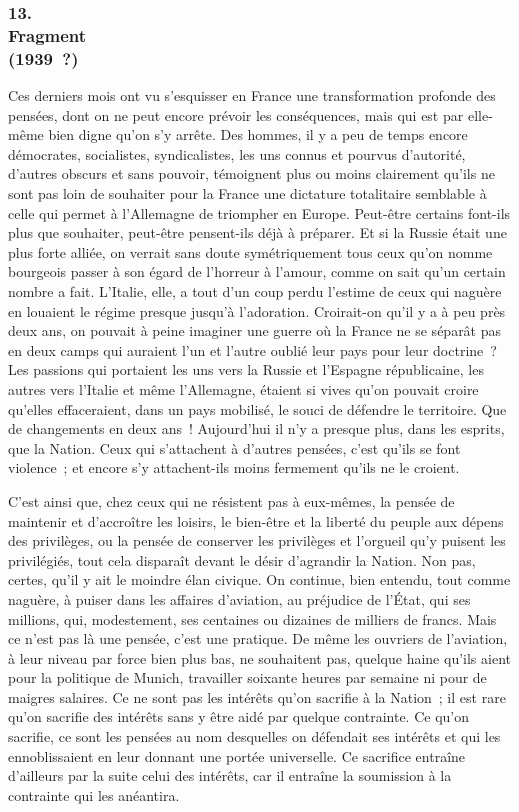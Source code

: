 \documentclass[french,twoside]{book} %
\begin{document}
\subsubsection[{13. Fragment, (1939 ?)}]{13. \\
Fragment \\
(1939 ?)}
\noindent \par
Ces derniers mois ont vu s'esquisser en France une transformation profonde des pensées, dont on ne peut encore prévoir les conséquences, mais qui est par elle-même bien digne qu'on s'y arrête. Des hommes, il y a peu de temps encore démocrates, socialistes, syndicalistes, les uns connus et pourvus d'autorité, d'autres obscurs et sans pouvoir, témoignent plus ou moins clairement qu'ils ne sont pas loin de souhaiter pour la France une dictature totalitaire semblable à celle qui permet à l'Allemagne de triompher en Europe. Peut-être certains font-ils plus que souhaiter, peut-être pensent-ils déjà à préparer. Et si la Russie était une plus forte alliée, on verrait sans doute symétriquement tous ceux qu'on nomme bourgeois passer à son égard de l'horreur à l'amour, comme on sait qu'un certain nombre a fait. L'Italie, elle, a tout d'un coup perdu l'estime de ceux qui naguère en louaient le régime presque jusqu'à l'adoration. Croirait-on qu'il y a à peu près deux ans, on pouvait à peine imaginer une guerre où la France ne se séparât pas en deux camps qui auraient l'un et l'autre oublié leur pays pour leur doctrine ? Les passions qui portaient les uns vers la Russie et l'Espagne républicaine, les autres vers l'Italie et même l'Allemagne, étaient si vives qu'on pouvait croire qu'elles effaceraient, dans un pays mobilisé, le souci de défendre le territoire. Que de changements en deux ans ! Aujourd'hui il n'y a presque plus, dans les esprits, que la Nation. Ceux qui s'attachent à d'autres pensées, c'est qu'ils se font violence ; et encore s'y attachent-ils moins fermement qu'ils ne le croient.\par
C'est ainsi que, chez ceux qui ne résistent pas à eux-mêmes, la pensée de maintenir et d'accroître les loisirs, le bien-être et la liberté du peuple aux dépens des privilèges, ou la pensée de conserver les privilèges et l'orgueil qu'y puisent les privilégiés, tout cela disparaît devant le désir d'agrandir la Nation. Non pas, certes, qu'il y ait le moindre élan civique. On continue, bien entendu, tout comme naguère, à puiser dans les affaires d'aviation, au préjudice de l'État, qui ses millions, qui, modestement, ses centaines ou dizaines de milliers de francs. Mais ce n'est pas là une pensée, c'est une pratique. De même les ouvriers de l'aviation, à leur niveau par force bien plus bas, ne souhaitent pas, quelque haine qu'ils aient pour la politique de Munich, travailler soixante heures par semaine ni pour de maigres salaires. Ce ne sont pas les intérêts qu'on sacrifie à la Nation ; il est rare qu'on sacrifie des intérêts sans y être aidé par quelque contrainte. Ce qu'on sacrifie, ce sont les pensées au nom des­quelles on défendait ses intérêts et qui les ennoblissaient en leur donnant une portée universelle. Ce sacrifice entraîne d'ailleurs par la suite celui des intérêts, car il entraîne la soumission à la contrainte qui les anéantira.\par
\end{document}
